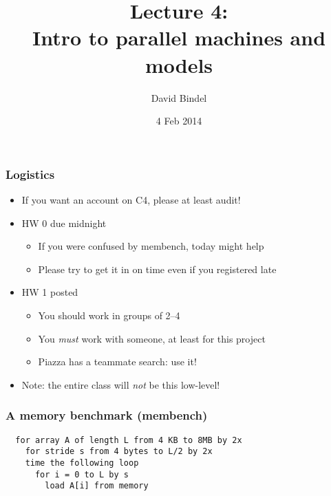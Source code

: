 \documentclass{beamer}
\title[CS 5220, Spring 2014]{Lecture 4: \\
  Intro to parallel machines and models}
\author[]{David Bindel} \date[]{4 Feb 2014}
\begin{document}
\begin{frame}
  \titlepage
\end{frame}


\begin{frame}
  \frametitle{Logistics}

  \begin{itemize}
  \item If you want an account on C4, please at least audit!
  \item HW 0 due midnight
    \begin{itemize}
    \item If you were confused by membench, today might help
    \item Please try to get it in on time even if you registered late
    \end{itemize}
  \item HW 1 posted
    \begin{itemize}
    \item You should work in groups of 2--4
    \item You {\em must} work with someone, at least for this project
    \item Piazza has a teammate search: use it!
    \end{itemize}
  \item Note: the entire class will {\em not} be this low-level!
  \end{itemize}
\end{frame}


\begin{frame}[fragile]
  \frametitle{A memory benchmark (membench)}

\begin{verbatim}
  for array A of length L from 4 KB to 8MB by 2x
    for stride s from 4 bytes to L/2 by 2x
    time the following loop
      for i = 0 to L by s
        load A[i] from memory
\end{verbatim}

\end{frame}
\end{document}
